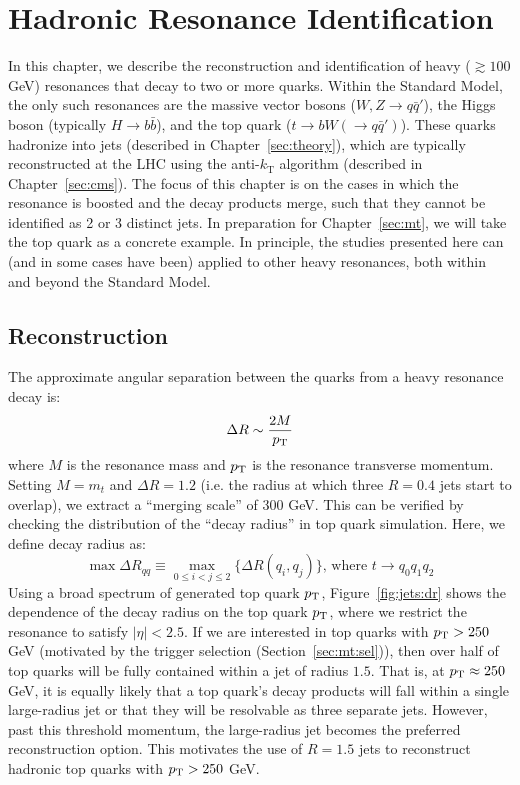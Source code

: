 \chapter{Hadronic Resonance Identification}
\label{sec:jets}

In this chapter, we describe the reconstruction and identification of heavy ($\gtrsim 100$ GeV) resonances that decay to two or more quarks.
Within the Standard Model, the only such resonances are the massive vector bosons ($W,Z\rightarrow q\bar{q}'$), the Higgs boson (typically $H\rightarrow b\bar{b}$), and the top quark ($t\rightarrow bW(\rightarrow q\bar{q}')$).
These quarks hadronize into jets (described in Chapter~\ref{sec:theory}), which are typically reconstructed at the LHC using the anti-$k_\mathrm{T}$ algorithm (described in Chapter~\ref{sec:cms}).
The focus of this chapter is on the cases in which the resonance is boosted and the decay products merge, such that they cannot be identified as 2 or 3 distinct jets.
In preparation for Chapter~\ref{sec:mt}, we will take the top quark as a concrete example.
In principle, the studies presented here can (and in some cases have been) applied to other heavy resonances, both within and beyond the Standard Model.

\section{Reconstruction}
\label{sec:jets:reco}

The approximate angular separation between the quarks from a heavy resonance decay is\needcite:
\begin{equation}
    \Delta R \sim \frac{2M}{p_\mathrm{T}}
\end{equation}
where $M$ is the resonance mass and $p_\mathrm{T}$ is the resonance transverse momentum.
Setting $M=m_t$ and $\Delta R=1.2$ (i.e. the radius at which three $R=0.4$ jets start to overlap), we extract a ``merging scale'' of $300$ GeV.  
This can be verified by checking the distribution of the ``decay radius'' in top quark simulation.
Here, we define decay radius as: 
\begin{equation}
    \max\Delta R_{qq} \equiv \displaystyle\max_{0\leq i < j \leq 2} \{\Delta R(q_i,q_j)\} \text{, where } t\rightarrow q_0q_1q_2
\end{equation}
Using a broad spectrum of generated top quark $p_\mathrm{T}$, Figure~\ref{fig:jets:dr} shows the dependence of the decay radius on the top quark $p_\mathrm{T}$, where we restrict the resonance to satisfy $|\eta|<2.5$.
If we are interested in top quarks with $p_\mathrm{T}>250$ GeV (motivated by the trigger selection (Section~\ref{sec:mt:sel})), then over half of top quarks will be fully contained within a jet of radius $1.5$.
That is, at $p_\mathrm{T}\approx 250$ GeV, it is equally likely that a top quark's decay products will fall within a single large-radius jet or that they will be resolvable as three separate jets. 
However, past this threshold momentum, the large-radius jet becomes the preferred reconstruction option.
This motivates the use of $R=1.5$ jets to reconstruct hadronic top quarks with $p_\mathrm{T}>250$ GeV. 

